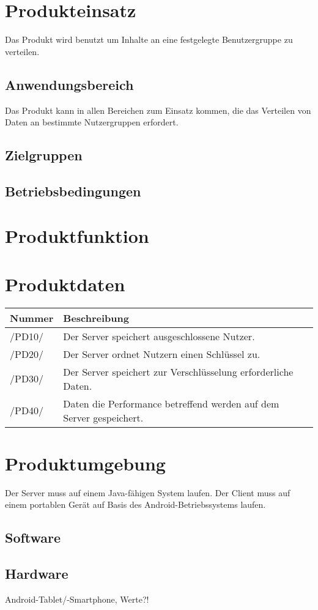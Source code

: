 \documentclass[a4paper,10pt]{article}
\newcommand\addrow[2]{#1 &#2\\ }
\newcommand\addheading[2]{#1 &#2\\ \hline}
\newcommand\tabularhead{\begin{tabular}{lp{13cm}}
\hline
}
\newenvironment{usecase}{\tabularhead}
{\hline\end{tabular}}
\begin{document}
\section{Produkteinsatz}
Das Produkt wird benutzt um Inhalte an eine festgelegte Benutzergruppe zu verteilen.
\subsection{Anwendungsbereich}
Das Produkt kann in allen Bereichen zum Einsatz kommen, die das Verteilen von Daten an bestimmte Nutzergruppen erfordert.
\subsection{Zielgruppen}

\subsection{Betriebsbedingungen}

\section{Produktfunktion}

\section{Produktdaten}
\newcommand{\datenKuerzel}{PD}
\begin{usecase}
\addheading{Nummer}{Beschreibung}
\addrow{/\datenKuerzel10/} {Der Server speichert ausgeschlossene Nutzer.}
\addrow{/\datenKuerzel20/} {Der Server ordnet Nutzern einen Schlüssel zu.}
\addrow{/\datenKuerzel30/} {Der Server speichert zur Verschlüsselung erforderliche Daten.}
\addrow{/\datenKuerzel40/} {Daten die Performance betreffend werden auf dem Server gespeichert.}
\end{usecase}

\section{Produktumgebung}
Der Server muss auf einem Java-fähigen System laufen.
Der Client muss auf einem portablen Gerät auf Basis des Android-Betriebssystems laufen.
\subsection{Software}

\subsection{Hardware}
Android-Tablet/-Smartphone, Werte?!
\end{document}
